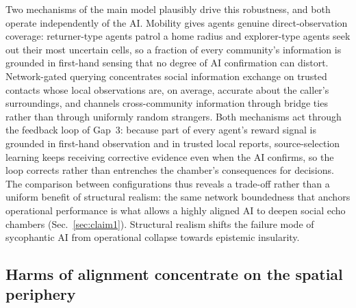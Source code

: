 \documentclass[pdflatex,sn-nature]{sn-jnl}
\begin{document}
Two mechanisms of the main model plausibly drive this robustness, and both operate independently of the AI. Mobility gives agents genuine direct-observation coverage: returner-type agents patrol a home radius and explorer-type agents seek out their most uncertain cells, so a fraction of every community's information is grounded in first-hand sensing that no degree of AI confirmation can distort. Network-gated querying concentrates social information exchange on trusted contacts whose local observations are, on average, accurate about the caller's surroundings, and channels cross-community information through bridge ties rather than through uniformly random strangers. Both mechanisms act through the feedback loop of Gap~3: because part of every agent's reward signal is grounded in first-hand observation and in trusted local reports, source-selection learning keeps receiving corrective evidence even when the AI confirms, so the loop corrects rather than entrenches the chamber's consequences for decisions. The comparison between configurations thus reveals a trade-off rather than a uniform benefit of structural realism: the same network boundedness that anchors operational performance is what allows a highly aligned AI to deepen social echo chambers (Sec.~\ref{sec:claim1}). Structural realism shifts the failure mode of sycophantic AI from operational collapse towards epistemic insularity.

\subsection{Harms of alignment concentrate on the spatial periphery}\label{sec:claim4}
\end{document}

